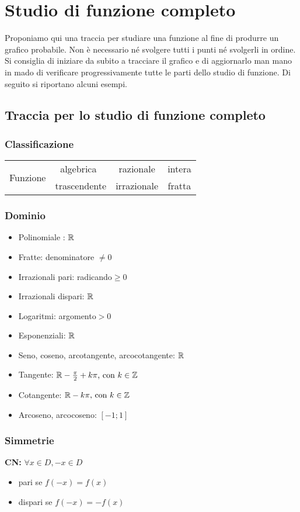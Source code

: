 \chapter{Studio di funzione completo}
Proponiamo qui una traccia per studiare una funzione al fine di produrre un grafico probabile. Non è necessario né svolgere tutti i punti né svolgerli in ordine. Si consiglia di iniziare da subito a tracciare il grafico e di aggiornarlo man mano in mado di verificare progressivamente tutte le parti dello studio di funzione. Di seguito si riportano alcuni esempi.
\section{Traccia per lo studio di funzione completo}
    \subsection{Classificazione}
    \begin{tabular}{|c|c|c|c|}
        \hline
        \multirow{2}{4em}{Funzione} & algebrica\ & razionale & intera\\ \cline{2-4}
         & trascendente & irrazionale & fratta \\ \hline
    \end{tabular}
    \subsection{Dominio}
    \begin{itemize}
        \item Polinomiale : $\mathbb{R}$
        \item Fratte: denominatore $\neq 0$
        \item Irrazionali pari: radicando$\geq0$
        \item Irrazionali dispari: $\mathbb{R}$
        \item Logaritmi: argomento$>0$
        \item Esponenziali: $\mathbb{R}$
        \item Seno, coseno, arcotangente, arcocotangente: $\mathbb{R}$
        \item Tangente: $\mathbb{R} -{\frac{\pi}{2}+k\pi}\text{, con } k\in\mathbb{Z}$
        \item Cotangente: $\mathbb{R} -{k\pi}\text{, con } k\in\mathbb{Z}$
        \item Arcoseno, arcocoseno: $[-1;1]$
    \end{itemize}
    \subsection{Simmetrie}
    \textbf{CN:} $\forall x \in D, -x \in D$
    \begin{itemize}
        \item pari se $f(-x)=f(x)$
        \item dispari se $f(-x)=-f(x)$
    \end{itemize}
